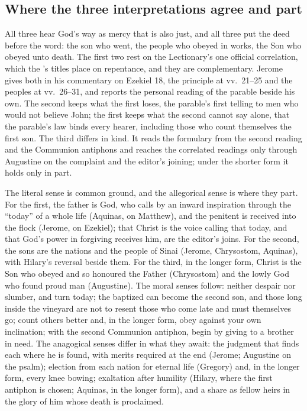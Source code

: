 \subsection{Where the three interpretations agree and part}

All three hear God's way as mercy that is also just, and all three put the deed
before the word: the son who went, the people who obeyed in works, the Son who
obeyed unto death. The first two rest on the Lectionary's one official
correlation, which the 's titles place on repentance, and they are
complementary. Jerome gives both in his commentary on Ezekiel 18, the principle
at vv.~21--25 and the peoples at vv.~26--31, and reports the personal reading
of the parable beside his own. The second keeps what the first loses, the
parable's first telling to men who would not believe John; the first keeps what
the second cannot say alone, that the parable's law binds every hearer,
including those who count themselves the first son. The third differs in kind.
It reads the formulary from the second reading and the Communion antiphons and
reaches the correlated readings only through Augustine on the complaint and the
editor's joining; under the shorter form it holds only in part.

The literal sense is common ground, and the allegorical sense is where they
part. For the first, the father is God, who calls by an inward inspiration
through the ``today'' of a whole life (Aquinas, on Matthew), and the penitent
is received into the flock (Jerome, on Ezekiel); that Christ is the voice
calling that today, and that God's power in forgiving receives him, are the
editor's joins. For the second, the sons are the nations and the people of
Sinai (Jerome, Chrysostom, Aquinas), with Hilary's reversal beside them. For
the third, in the longer form, Christ is the Son who obeyed and so honoured the
Father (Chrysostom) and the lowly God who found proud man (Augustine). The
moral senses follow: neither despair nor slumber, and turn today; the baptized
can become the second son, and those long inside the vineyard are not to
resent those who come late and must themselves go; count others better and,
in the longer form, obey against your own inclination; with the second
Communion antiphon, begin by giving to a brother in need. The anagogical senses differ in
what they await: the judgment that finds each where he is found, with merits
required at the end (Jerome; Augustine on the psalm); election from each nation
for eternal life (Gregory) and, in the longer form, every knee bowing;
exaltation after humility (Hilary, where the first antiphon is chosen; Aquinas,
in the longer form), and a share as fellow heirs in the glory of him whose
death is proclaimed.

